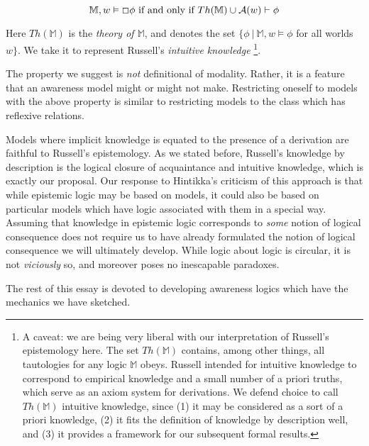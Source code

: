 \[ \mathbb{M}, w \models \Box \phi \textup{ if and only if } Th(\mathbb{M}) \cup
\mathcal{A}(w) \vdash \phi \]

Here $Th(\mathbb{M})$ is the \emph{theory of $\mathbb{M}$}, and
denotes the set $\{ \phi\ |\ \mathbb{M},w \models \phi$ for all worlds
$w \}$.  We take it to represent Russell's \emph{intuitive
  knowledge} \footnote{A caveat: we are being very liberal with our interpretation
  of Russell's
  epistemology here.  The set $Th(\mathbb{M})$ contains, among other
  things, all tautologies for any logic $\mathbb{M}$ obeys.  Russell
  intended for intuitive knowledge to correspond to empirical
  knowledge and a small number of a priori truths, which serve as
  an axiom system for derivations.  We defend choice to call $Th(\mathbb{M})$ intuitive
  knowledge, since (1) it may be considered as a sort of a priori knowledge, (2) it fits the definition of knowledge by description well,
  and (3) it provides a framework for our subsequent formal
  results.}. 
  
The property we suggest is \emph{not} definitional of modality.  Rather, it is a
feature that an awareness model might or might not make.  Restricting
oneself to models with the above property is
similar to restricting models to the class which has reflexive
relations.

Models where implicit knowledge is
equated to the presence
of a derivation are faithful to Russell's epistemology.  As we stated
before, Russell's knowledge by description is the logical closure of
acquaintance and intuitive knowledge, which is exactly our proposal.  Our response
to Hintikka's criticism of this approach is that while epistemic logic may be
based on models, it could also be based on particular models
which have logic associated with them in a special way.  Assuming that
knowledge in epistemic logic corresponds to \emph{some} notion of logical consequence
does not require us to have already formulated the notion of logical
consequence we will ultimately
develop.  While logic about logic is circular, it is not
\emph{viciously} so, and moreover poses no inescapable paradoxes.

The rest of this essay is devoted to developing awareness logics which have
the mechanics we have sketched.


